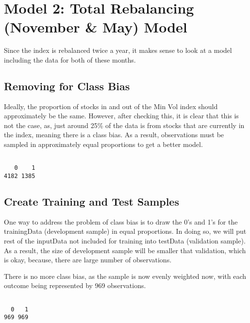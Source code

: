 \documentclass[12pt,twoside]{reedthesis}
\newenvironment{Shaded}{\begin{snugshade}}{\end{snugshade}}
\newcommand{\KeywordTok}[1]{\textcolor[rgb]{0.13,0.29,0.53}{\textbf{{#1}}}}
\newcommand{\NormalTok}[1]{{#1}}
\theoremstyle{definition}
\theoremstyle{definition}
\theoremstyle{definition}
\theoremstyle{remark}
\begin{document}
\section{Model 2: Total Rebalancing (November \& May)
Model}\label{model-2-total-rebalancing-november-may-model}

Since the index is rebalanced twice a year, it makes sense to look at a
model including the data for both of these months.

\subsection{Removing for Class Bias}\label{removing-for-class-bias}

Ideally, the proportion of stocks in and out of the Min Vol index should
approximately be the same. However, after checking this, it is clear
that this is not the case, as, just around 25\% of the data is from
stocks that are currently in the index, meaning there is a class bias.
As a result, observations must be sampled in approximately equal
proportions to get a better model.
\begin{Shaded}
\end{Shaded}
\begin{verbatim}

   0    1 
4182 1385 
\end{verbatim}
\subsection{Create Training and Test
Samples}\label{create-training-and-test-samples}

One way to address the problem of class bias is to draw the 0's and 1's
for the trainingData (development sample) in equal proportions. In doing
so, we will put rest of the inputData not included for training into
testData (validation sample). As a result, the size of development
sample will be smaller that validation, which is okay, because, there
are large number of observations.

There is no more class bias, as the sample is now evenly weighted now,
with each outcome being represented by 969 observations.
\begin{Shaded}
\end{Shaded}
\begin{verbatim}

  0   1 
969 969 
\end{verbatim}
\end{document}
